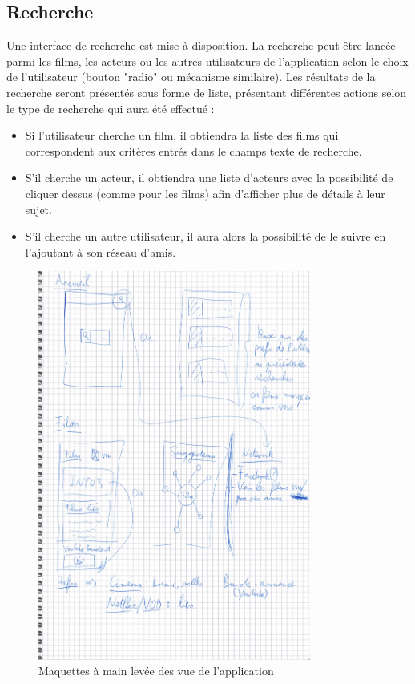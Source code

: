 \subsection{Recherche}
Une interface de recherche est mise à disposition. La recherche peut être lancée parmi les films, les acteurs ou les autres utilisateurs de l'application selon le choix de l'utilisateur (bouton "radio" ou mécanisme similaire).
Les résultats de la recherche seront présentés sous forme de liste, présentant différentes actions selon le type de recherche qui aura été effectué :
\begin{itemize}
    \item Si l'utilisateur cherche un film, il obtiendra la liste des films qui correspondent aux critères entrés dans le champs texte de recherche.
    \item S'il cherche un acteur, il obtiendra une liste d'acteurs avec la possibilité de cliquer dessus (comme pour les films) afin d'afficher plus de détails à leur sujet.
    \item S'il cherche un autre utilisateur, il aura alors la possibilité de le suivre en l'ajoutant à son réseau d'amis.
\end{itemize}

\begin{figure}
    \begin{center}
        \includegraphics[width=0.8\textwidth]{img/maquettes.jpg}
    \end{center}
    \caption{Maquettes à main levée des vue de l'application}
    \label{maquettes}
\end{figure}

